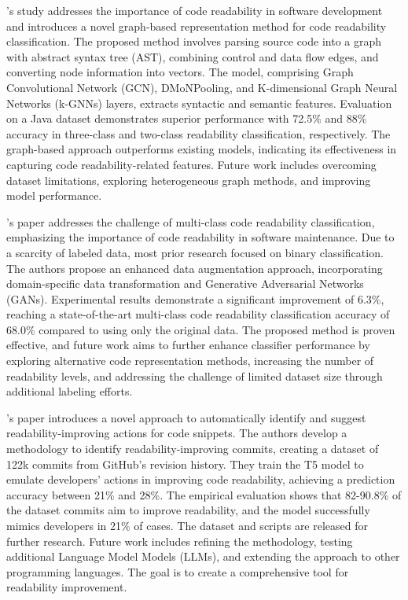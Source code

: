 \documentclass[%
class=scrreprt,
chapterprefix=false,%
open=right,%
twoside=false,%
paper=a4,%
logofile={Logo\_zentral\_farbig\_EN.png},%
thesistype=master,%
UKenglish,%
]{se2thesis}
\begin{document}
	\citeauthor{mi2023graph}'s study addresses the importance of code readability in software development and introduces a novel graph-based representation method for code readability classification. The proposed method involves parsing source code into a graph with abstract syntax tree (AST), combining control and data flow edges, and converting node information into vectors. The model, comprising Graph Convolutional Network (GCN), DMoNPooling, and K-dimensional Graph Neural Networks (k-GNNs) layers, extracts syntactic and semantic features. Evaluation on a Java dataset demonstrates superior performance with 72.5\% and 88\% accuracy in three-class and two-class readability classification, respectively. The graph-based approach outperforms existing models, indicating its effectiveness in capturing code readability-related features. Future work includes overcoming dataset limitations, exploring heterogeneous graph methods, and improving model performance. 
	
	\citeauthor{mi2022enhanced}'s paper addresses the challenge of multi-class code readability classification, emphasizing the importance of code readability in software maintenance. Due to a scarcity of labeled data, most prior research focused on binary classification. The authors propose an enhanced data augmentation approach, incorporating domain-specific data transformation and Generative Adversarial Networks (GANs). Experimental results demonstrate a significant improvement of 6.3\%, reaching a state-of-the-art multi-class code readability classification accuracy of 68.0\% compared to using only the original data. The proposed method is proven effective, and future work aims to further enhance classifier performance by exploring alternative code representation methods, increasing the number of readability levels, and addressing the challenge of limited dataset size through additional labeling efforts.
	
	\citeauthor{vitale2023using}'s paper introduces a novel approach to automatically identify and suggest readability-improving actions for code snippets. The authors develop a methodology to identify readability-improving commits, creating a dataset of 122k commits from GitHub's revision history. They train the T5 model to emulate developers' actions in improving code readability, achieving a prediction accuracy between 21\% and 28\%. The empirical evaluation shows that 82-90.8\% of the dataset commits aim to improve readability, and the model successfully mimics developers in 21\% of cases. The dataset and scripts are released for further research. Future work includes refining the methodology, testing additional Language Model Models (LLMs), and extending the approach to other programming languages. The goal is to create a comprehensive tool for readability improvement.
	
\end{document}
